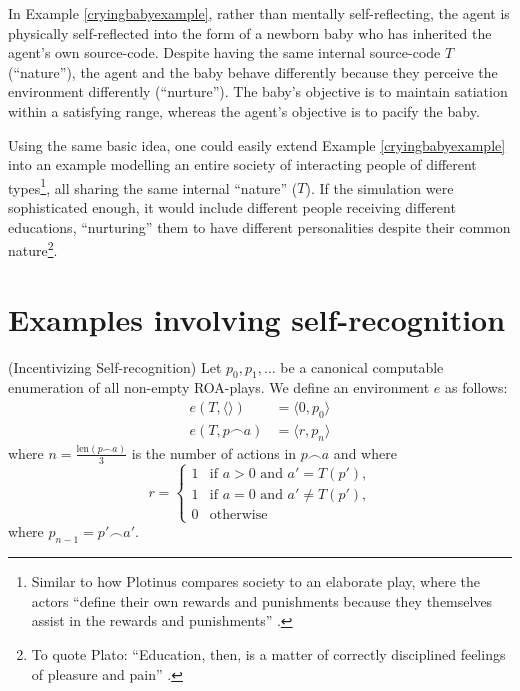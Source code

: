 \documentclass[runningheads]{llncs}
\begin{document}
In Example \ref{cryingbabyexample}, rather than mentally self-reflecting,
the agent is physically self-reflected into the form of a newborn baby
who has inherited the agent's own source-code. Despite having the same
internal source-code $T$ (``nature''), the agent and the baby behave
differently because they perceive the environment differently (``nurture'').
The baby's objective is to maintain satiation within a satisfying range,
whereas the agent's objective is to pacify the baby.

Using the same basic idea, one could easily extend Example \ref{cryingbabyexample}
into an example modelling an entire society of interacting people of different
types\footnote{Similar to how Plotinus compares society to an elaborate play,
where the actors ``define their own rewards and punishments because
they themselves assist in the rewards and punishments'' \cite{plotinus}.},
all sharing the same internal ``nature'' ($T$).
If the simulation were sophisticated enough, it would include different people
receiving different educations, ``nurturing'' them to have different
personalities despite their common nature\footnote{To quote Plato:
``Education, then, is a matter of correctly disciplined feelings of pleasure
and pain'' \cite{platolaws}.}.

\section{Examples involving self-recognition}

\begin{example}
\label{selfrecognitionexample}
    (Incentivizing Self-recognition)
    Let $p_0,p_1,\ldots$ be a canonical computable enumeration of all non-empty ROA-plays.
    We define an environment $e$ as follows:
    \begin{align*}
        e(T,\langle\rangle) &= \langle 0, p_0\rangle\\
        e(T,p\frown a) &= \langle r, p_{n}\rangle
    \end{align*}
    where $n=\frac{\mbox{len}(p\frown a)}{3}$ is the number of actions in $p\frown a$ and where
    \[
        r =
        \begin{cases}
            1 &\mbox{if $a>0$ and $a'=T(p')$,}\\
            1 &\mbox{if $a=0$ and $a'\not=T(p')$,}\\
            0 &\mbox{otherwise}
        \end{cases}
    \]
    where $p_{n-1}=p'\frown a'$.
\end{example}
\end{document}

